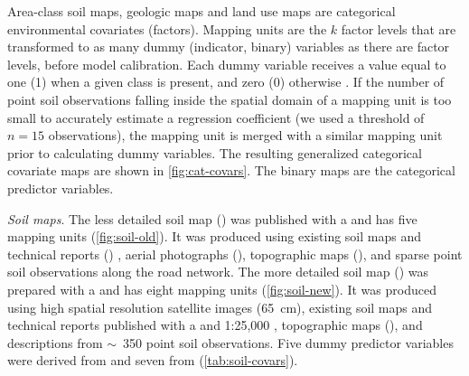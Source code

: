 Area-class soil maps, geologic maps and land use maps are categorical environmental covariates (factors). 
Mapping units are the $k$ factor levels that are transformed to as many dummy (indicator, binary) variables as 
there are factor levels, before model calibration. Each dummy variable receives a value equal to one (1) when a 
given class is present, and zero (0) otherwise \cite{Everitt2006}. If the number of point soil observations 
falling inside the spatial domain of a mapping unit is too small to accurately estimate a regression 
coefficient (we used a threshold of $n=15$ observations), the mapping unit is merged with a similar mapping 
unit prior to calculating dummy variables. The resulting generalized categorical covariate maps are shown in 
\autoref{fig:cat-covars}. The binary maps are the categorical predictor variables.

\noindent\textit{Soil maps}. The less detailed soil map (\soilOld) was published with a  and has 
five mapping units \cite{AzolinEtAl1988} (\autoref{fig:soil-old}). It was produced using existing soil maps and 
technical reports () \cite{Brasil1973}, aerial photographs (), topographic maps 
(), and sparse point soil observations along the road network. The more detailed soil map 
(\soilNew) was prepared with a  and has eight mapping units \cite{MiguelEtAl2012}
(\autoref{fig:soil-new}). It was produced using high spatial resolution satellite images (65~cm), existing soil 
maps and technical reports published with a  \cite{Poelking2007} and 1:25,000 
\cite{PedronEtAl2006b}, topographic maps (), and descriptions from $\sim$~350 point soil 
observations. Five dummy predictor variables were derived from \soilOld{} and seven from \soilNew{} 
(\autoref{tab:soil-covars}).

